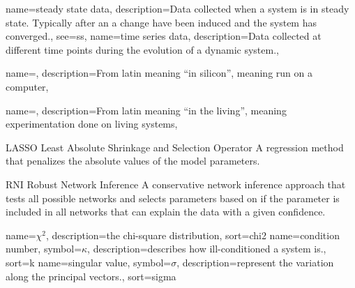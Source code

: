 {
  name={steady state data},
  description={Data collected when a system is in steady state. Typically after an a change have been induced and the system has converged.},
  see={ss},
}
{
  name={time series data},
  description={Data collected at different time points during the evolution of a dynamic system.},
}

{
  name={\insilico},
  description={From latin meaning ``in silicon'', meaning run on a computer},
}

{
  name={\invivo},
  description={From latin meaning ``in the living'', meaning experimentation done on living systems},
}

{LASSO}
{Least Absolute Shrinkage and Selection Operator}
{A regression method that penalizes the absolute values of the model parameters.\cite{Tibshirani1996}}

{RNI}
{Robust Network Inference}
{A conservative network inference approach that tests all possible networks and selects parameters based on if the parameter is included in all networks that can explain the data with a given confidence\cite{Nordling2013phdthesis}.}

{
  name={\ensuremath{\chi^2}},
  description={the chi-square distribution},
  sort=chi2
}
{
  name={condition number},
  symbol={\ensuremath{\kappa}},
  description={describes how ill-conditioned a system is.},
  sort=k
}
{
  name={singular value},
  symbol={\ensuremath{\sigma}},
  description={represent the variation along the principal vectors.},
  sort=sigma
}
